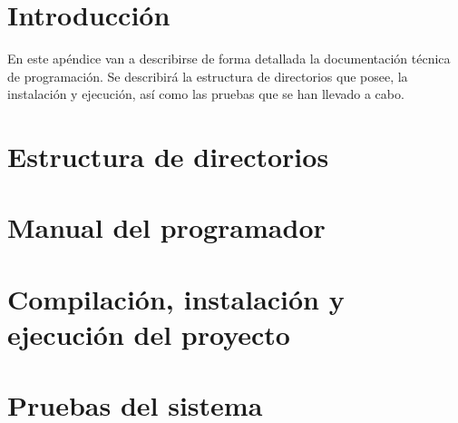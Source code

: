 
\section{Introducción}
En este apéndice van a describirse de forma detallada la documentación técnica de programación. Se describirá la estructura de directorios que posee, la instalación y ejecución, así como las pruebas que se han llevado a cabo. 

\section{Estructura de directorios}

\section{Manual del programador}

\section{Compilación, instalación y ejecución del proyecto}

\section{Pruebas del sistema}
